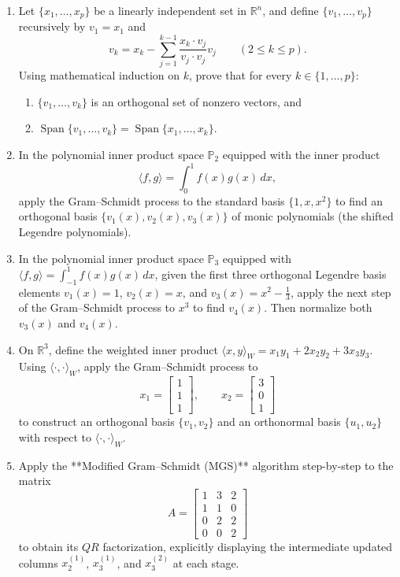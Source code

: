 \documentclass[11pt, letterpaper]{article}
\theoremstyle{definition}
\theoremstyle{remark}
\begin{document}
\begin{enumerate}[label=\textbf{Problem \arabic*.}, leftmargin=*, itemsep=0.9em]
    \item Let $\{x_1, \dots, x_p\}$ be a linearly independent set in $\mathbb{R}^n$, and define $\{v_1, \dots, v_p\}$ recursively by $v_1 = x_1$ and
    \[
        v_k = x_k - \sum_{j=1}^{k-1} \frac{x_k \cdot v_j}{v_j \cdot v_j} v_j \qquad (2 \le k \le p).
    \]
    Using mathematical induction on $k$, prove that for every $k \in \{1, \dots, p\}$:
    \begin{enumerate}[label=(\roman*)]
        \item $\{v_1, \dots, v_k\}$ is an orthogonal set of nonzero vectors, and
        \item $\operatorname{Span}\{v_1, \dots, v_k\} = \operatorname{Span}\{x_1, \dots, x_k\}$.
    \end{enumerate}

    \item In the polynomial inner product space $\mathbb{P}_2$ equipped with the inner product
    \[
        \langle f, g \rangle = \int_0^1 f(x) g(x)\,dx,
    \]
    apply the Gram--Schmidt process to the standard basis $\{1, x, x^2\}$ to find an orthogonal basis $\{v_1(x), v_2(x), v_3(x)\}$ of monic polynomials (the shifted Legendre polynomials).

    \item In the polynomial inner product space $\mathbb{P}_3$ equipped with $\langle f, g \rangle = \int_{-1}^1 f(x) g(x)\,dx$, given the first three orthogonal Legendre basis elements $v_1(x) = 1$, $v_2(x) = x$, and $v_3(x) = x^2 - \frac{1}{3}$, apply the next step of the Gram--Schmidt process to $x^3$ to find $v_4(x)$. Then normalize both $v_3(x)$ and $v_4(x)$.

    \item On $\mathbb{R}^3$, define the weighted inner product $\langle x, y \rangle_W = x_1 y_1 + 2 x_2 y_2 + 3 x_3 y_3$. Using $\langle \cdot, \cdot \rangle_W$, apply the Gram--Schmidt process to
    \[
        x_1 = \begin{bmatrix} 1 \\ 1 \\ 1 \end{bmatrix}, \qquad x_2 = \begin{bmatrix} 3 \\ 0 \\ 1 \end{bmatrix}
    \]
    to construct an orthogonal basis $\{v_1, v_2\}$ and an orthonormal basis $\{u_1, u_2\}$ with respect to $\langle \cdot, \cdot \rangle_W$.

    \item Apply the **Modified Gram--Schmidt (MGS)** algorithm step-by-step to the matrix
    \[
        A = \begin{bmatrix}
            1 & 3 & 2 \\
            1 & 1 & 0 \\
            0 & 2 & 2 \\
            0 & 0 & 2
        \end{bmatrix}
    \]
    to obtain its $QR$ factorization, explicitly displaying the intermediate updated columns $x_2^{(1)}$, $x_3^{(1)}$, and $x_3^{(2)}$ at each stage.


\end{enumerate}
\end{document}
